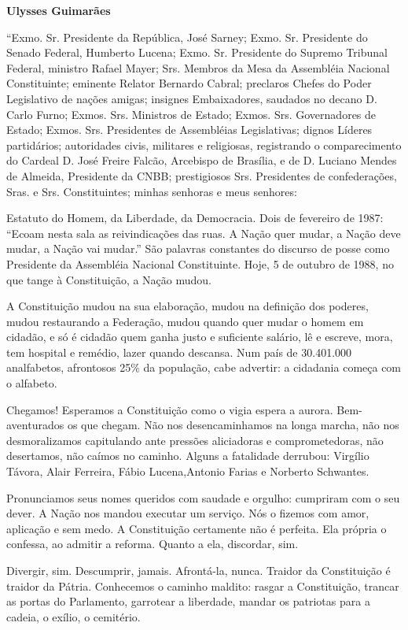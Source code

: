 \textbf{Ulysses Guimarães}

``Exmo. Sr. Presidente da República, José Sarney; Exmo. Sr. Presidente
do Senado Federal, Humberto Lucena; Exmo. Sr. Presidente do Supremo
Tribunal Federal, ministro Rafael Mayer; Srs. Membros da Mesa da
Assembléia Nacional Constituinte; eminente Relator Bernardo Cabral;
preclaros Chefes do Poder Legislativo de nações amigas; insignes
Embaixadores, saudados no decano D. Carlo Furno; Exmos. Srs. Ministros
de Estado; Exmos. Srs. Governadores de Estado; Exmos. Srs. Presidentes
de Assembléias Legislativas; dignos Líderes partidários; autoridades
civis, militares e religiosas, registrando o comparecimento do Cardeal
D. José Freire Falcão, Arcebispo de Brasília, e de D. Luciano Mendes de
Almeida, Presidente da CNBB; prestigiosos Srs. Presidentes de
confederações, Sras. e Srs. Constituintes; minhas senhoras e meus
senhores:

Estatuto do Homem, da Liberdade, da Democracia. Dois de fevereiro de
1987: ``Ecoam nesta sala as reivindicações das ruas. A Nação quer mudar,
a Nação deve mudar, a Nação vai mudar.'' São palavras constantes do
discurso de posse como Presidente da Assembléia Nacional Constituinte.
Hoje, 5 de outubro de 1988, no que tange à Constituição, a Nação mudou.

A Constituição mudou na sua elaboração, mudou na definição dos poderes,
mudou restaurando a Federação, mudou quando quer mudar o homem em
cidadão, e só é cidadão quem ganha justo e suficiente salário, lê e
escreve, mora, tem hospital e remédio, lazer quando descansa. Num país
de 30.401.000 analfabetos, afrontosos 25\% da população, cabe advertir:
a cidadania começa com o alfabeto.

Chegamos! Esperamos a Constituição como o vigia espera a aurora.
Bem-aventurados os que chegam. Não nos desencaminhamos na longa marcha,
não nos desmoralizamos capitulando ante pressões aliciadoras e
comprometedoras, não desertamos, não caímos no caminho. Alguns a
fatalidade derrubou: Virgílio Távora, Alair Ferreira, Fábio
Lucena,Antonio Farias e Norberto Schwantes.

Pronunciamos seus nomes queridos com saudade e orgulho: cumpriram com o
seu dever. A Nação nos mandou executar um serviço. Nós o fizemos com
amor, aplicação e sem medo. A Constituição certamente não é perfeita.
Ela própria o confessa, ao admitir a reforma. Quanto a ela, discordar,
sim.

Divergir, sim. Descumprir, jamais. Afrontá-la, nunca. Traidor da
Constituição é traidor da Pátria. Conhecemos o caminho maldito: rasgar a
Constituição, trancar as portas do Parlamento, garrotear a liberdade,
mandar os patriotas para a cadeia, o exílio, o cemitério.

